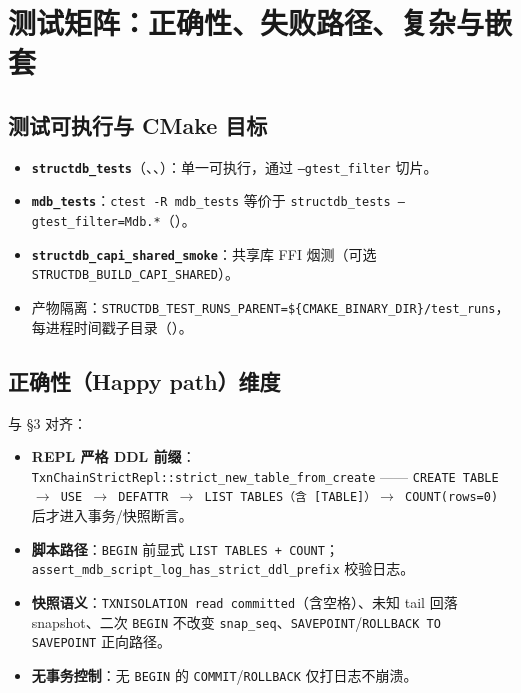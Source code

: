 \section{测试矩阵：正确性、失败路径、复杂与嵌套}
\label{sec:test-matrix}

\subsection{测试可执行与 CMake 目标}

\begin{itemize}
  \item \textbf{\texttt{structdb\_tests}}（、、）：单一可执行，通过 \texttt{--gtest\_filter} 切片。
  \item \textbf{\texttt{mdb\_tests}}：\texttt{ctest -R mdb\_tests} 等价于 \texttt{structdb\_tests --gtest\_filter=Mdb.*}（）。
  \item \textbf{\texttt{structdb\_capi\_shared\_smoke}}：共享库 FFI 烟测（可选 \texttt{STRUCTDB\_BUILD\_CAPI\_SHARED}）。
  \item 产物隔离：\texttt{STRUCTDB\_TEST\_RUNS\_PARENT=\$\{CMAKE\_BINARY\_DIR\}/test\_runs}，每进程时间戳子目录（）。
\end{itemize}

\subsection{正确性（Happy path）维度}

与  \S3 对齐：

\begin{itemize}
  \item \textbf{REPL 严格 DDL 前缀}：\texttt{TxnChainStrictRepl::strict\_new\_table\_from\_create} —— \texttt{CREATE TABLE $\rightarrow$ USE $\rightarrow$ DEFATTR $\rightarrow$ LIST TABLES（含 \texttt{[TABLE]}）$\rightarrow$ COUNT(rows=0)} 后才进入事务/快照断言。
  \item \textbf{脚本路径}：\texttt{BEGIN} 前显式 \texttt{LIST TABLES + COUNT}；\texttt{assert\_mdb\_script\_log\_has\_strict\_ddl\_prefix} 校验日志。
  \item \textbf{快照语义}：\texttt{TXNISOLATION read committed}（含空格）、未知 tail 回落 snapshot、二次 \texttt{BEGIN} 不改变 \texttt{snap\_seq}、\texttt{SAVEPOINT}/\texttt{ROLLBACK TO SAVEPOINT} 正向路径。
  \item \textbf{无事务控制}：无 \texttt{BEGIN} 的 \texttt{COMMIT}/\texttt{ROLLBACK} 仅打日志不崩溃。
\end{itemize}

